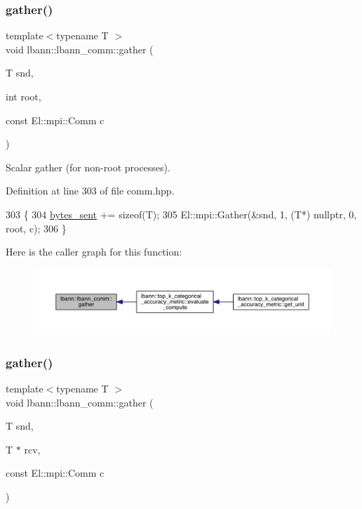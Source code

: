 \subsubsection{\texorpdfstring{gather()}{gather()}\hspace{0.1cm}{\footnotesize\ttfamily [1/5]}}
{\footnotesize\ttfamily template$<$typename T $>$ \\
void lbann\+::lbann\+\_\+comm\+::gather (\begin{DoxyParamCaption}\item[{T}]{snd,  }\item[{int}]{root,  }\item[{const El\+::mpi\+::\+Comm}]{c }\end{DoxyParamCaption})\hspace{0.3cm}{\ttfamily [inline]}}

Scalar gather (for non-\/root processes). 

Definition at line 303 of file comm.\+hpp.


\begin{DoxyCode}
303                                                   \{
304     \hyperlink{classlbann_1_1lbann__comm_ad1f146ae7337ece6266fd307944928e0}{bytes\_sent} += \textcolor{keyword}{sizeof}(T);
305     El::mpi::Gather(&snd, 1, (T*) \textcolor{keyword}{nullptr}, 0, root, c);
306   \}
\end{DoxyCode}
Here is the caller graph for this function\+:\nopagebreak
\begin{figure}[H]
\begin{center}
\leavevmode
\includegraphics[width=350pt]{classlbann_1_1lbann__comm_aa784298e6ed0f9f01a20b179d5110df9_icgraph}
\end{center}
\end{figure}
\mbox{\label{classlbann_1_1lbann__comm_ae4b572b9b6538ab148b3082f54514c19}} 
\subsubsection{\texorpdfstring{gather()}{gather()}\hspace{0.1cm}{\footnotesize\ttfamily [2/5]}}
{\footnotesize\ttfamily template$<$typename T $>$ \\
void lbann\+::lbann\+\_\+comm\+::gather (\begin{DoxyParamCaption}\item[{T}]{snd,  }\item[{T $\ast$}]{rcv,  }\item[{const El\+::mpi\+::\+Comm}]{c }\end{DoxyParamCaption})\hspace{0.3cm}{\ttfamily [inline]}}

